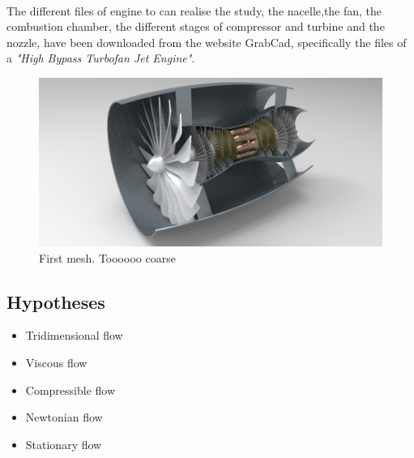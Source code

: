 \paragraph{}
The different files of engine to can realise the study, the nacelle,the fan, the combustion chamber, the different stages of compressor and turbine and the nozzle, have been downloaded from the website GrabCad, specifically the files of a \textit{"High Bypass Turbofan Jet Engine"}.

\begin{figure}[h!]
\centering
\includegraphics[scale=0.5]{./img/Turbofan.png}
\caption{First mesh. Toooooo coarse}
\end{figure}

\subsection{Hypotheses}

\begin{itemize}

	\item Tridimensional flow
	\item Viscous flow
	\item Compressible flow
	\item Newtonian flow
	\item Stationary flow

\end{itemize}




